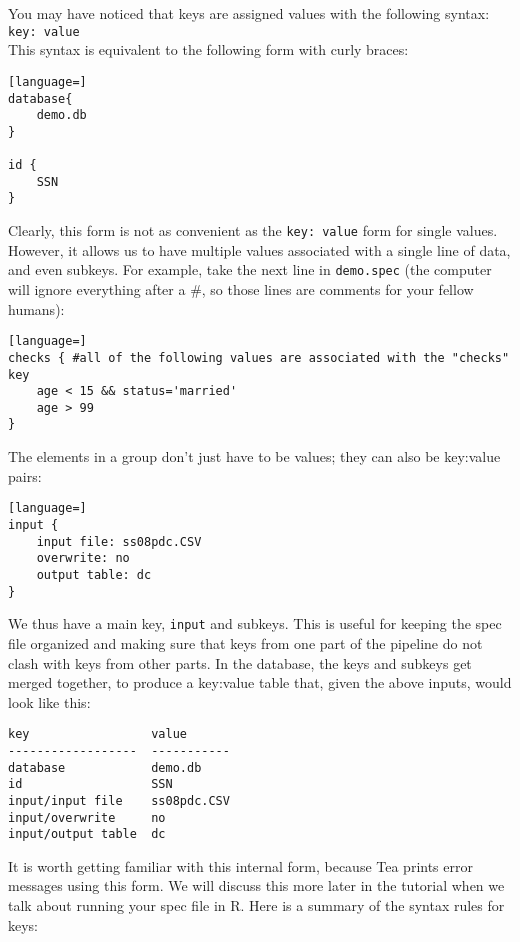 \documentclass{article}
\begin{document}
You may have noticed that keys are assigned values with the following syntax:\\

{\tt key: value}\\

This syntax is equivalent to the following form with curly braces:
\begin{lstlisting}[language=]
database{
	demo.db
}

id {
	SSN
}
\end{lstlisting}

Clearly, this form is not as convenient as the {\tt key: value} form for single values. However, it allows 
us to have multiple values associated with a single line of data, and even subkeys. For example, take  
the next line in {\tt demo.spec} (the computer will 
ignore everything after a \#, so those lines are comments for your fellow humans):

\begin{lstlisting}[language=]
checks { #all of the following values are associated with the "checks" key
	age < 15 && status='married'
	age > 99
}
\end{lstlisting}

The elements in a group don't just have to be values; they can also be key:value pairs:

\begin{lstlisting}[language=]
input { 
    input file: ss08pdc.CSV
    overwrite: no
    output table: dc
}
\end{lstlisting}


We thus have a main key, {\tt input} and subkeys.  This is useful for keeping the spec
file organized and making sure that keys from one part of the pipeline do not clash with
keys from other parts.  In the database, the keys and subkeys get merged together,
to produce a key:value table that, given the above inputs, would look like this:

\begin{verbatim}
key                 value
------------------  -----------
database            demo.db
id                  SSN
input/input file    ss08pdc.CSV
input/overwrite     no
input/output table  dc
\end{verbatim}

It is worth getting familiar with this internal form, because Tea prints error messages
using this form.  We will discuss this more later in the tutorial when we talk about
running your spec file in R.  Here is a summary of the syntax rules for keys:
\end{document}
